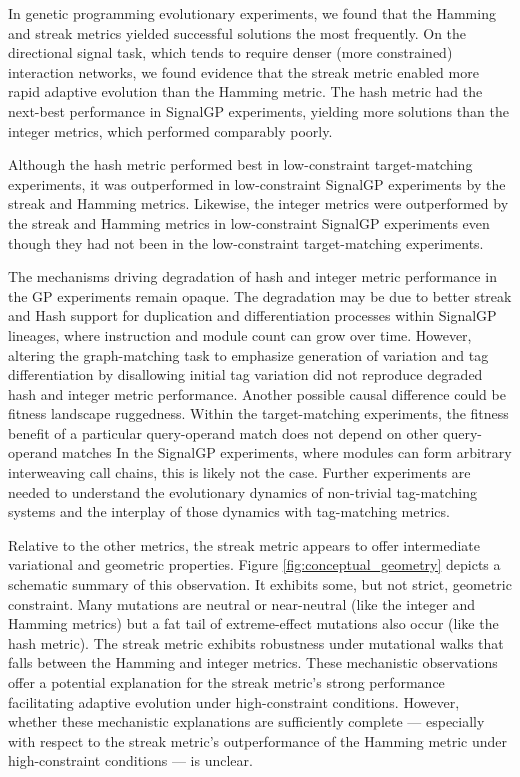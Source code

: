 In genetic programming evolutionary experiments, we found that the Hamming and streak metrics yielded successful solutions the most frequently.
On the directional signal task, which tends to require denser (more constrained) interaction networks, we found evidence that the streak metric enabled more rapid adaptive evolution than the Hamming metric.
The hash metric had the next-best performance in SignalGP experiments, yielding more solutions than the integer metrics, which performed comparably poorly.

Although the hash metric performed best in low-constraint target-matching experiments, it was outperformed in low-constraint SignalGP experiments by the streak and Hamming metrics.
Likewise, the integer metrics were outperformed by the streak and Hamming metrics in low-constraint SignalGP experiments even though they had not been in the low-constraint target-matching experiments.

The mechanisms driving degradation of hash and integer metric performance in the GP experiments remain opaque.
The degradation may be due to better streak and Hash support for duplication and differentiation processes within SignalGP lineages, where instruction and module count can grow over time.
However, altering the graph-matching task to emphasize generation of variation and tag differentiation by disallowing initial tag variation did not reproduce degraded hash and integer metric performance.
Another possible causal difference could be fitness landscape ruggedness.
Within the target-matching experiments, the fitness benefit of a particular query-operand match does not depend on other query-operand matches
In the SignalGP experiments, where modules can form arbitrary interweaving call chains, this is likely not the case.
Further experiments are needed to understand the evolutionary dynamics of non-trivial tag-matching systems and the interplay of those dynamics with tag-matching metrics.




Relative to the other metrics, the streak metric appears to offer intermediate variational and geometric properties.
Figure \ref{fig:conceptual_geometry} depicts a schematic summary of this observation.
It exhibits some, but not strict, geometric constraint.
Many mutations are neutral or near-neutral (like the integer and Hamming metrics) but a fat tail of extreme-effect mutations also occur (like the hash metric).
The streak metric exhibits robustness under mutational walks that falls between the Hamming and integer metrics.
These mechanistic observations offer a potential explanation for the streak metric's strong performance facilitating adaptive evolution under high-constraint conditions.
However, whether these mechanistic explanations are sufficiently complete --- especially with respect to the streak metric's outperformance of the Hamming metric under high-constraint conditions --- is unclear.

